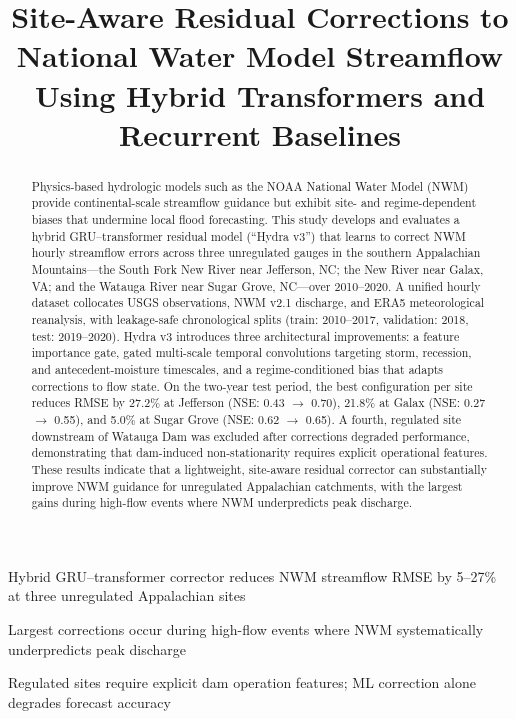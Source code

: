 \documentclass[draft]{agujournal2019}
\begin{document}
\title{Site-Aware Residual Corrections to National Water Model Streamflow Using Hybrid Transformers and Recurrent Baselines}




\begin{keypoints}
\item Hybrid GRU--transformer corrector reduces NWM streamflow RMSE by 5--27\% at three unregulated Appalachian sites
\item Largest corrections occur during high-flow events where NWM systematically underpredicts peak discharge
\item Regulated sites require explicit dam operation features; ML correction alone degrades forecast accuracy
\end{keypoints}

\begin{abstract}
Physics-based hydrologic models such as the NOAA National Water Model (NWM) provide continental-scale streamflow guidance but exhibit site- and regime-dependent biases that undermine local flood forecasting. This study develops and evaluates a hybrid GRU--transformer residual model (``Hydra v3'') that learns to correct NWM hourly streamflow errors across three unregulated gauges in the southern Appalachian Mountains---the South Fork New River near Jefferson, NC; the New River near Galax, VA; and the Watauga River near Sugar Grove, NC---over 2010--2020. A unified hourly dataset collocates USGS observations, NWM v2.1 discharge, and ERA5 meteorological reanalysis, with leakage-safe chronological splits (train: 2010--2017, validation: 2018, test: 2019--2020). Hydra v3 introduces three architectural improvements: a feature importance gate, gated multi-scale temporal convolutions targeting storm, recession, and antecedent-moisture timescales, and a regime-conditioned bias that adapts corrections to flow state. On the two-year test period, the best configuration per site reduces RMSE by 27.2\% at Jefferson (NSE: 0.43 $\to$ 0.70), 21.8\% at Galax (NSE: 0.27 $\to$ 0.55), and 5.0\% at Sugar Grove (NSE: 0.62 $\to$ 0.65). A fourth, regulated site downstream of Watauga Dam was excluded after corrections degraded performance, demonstrating that dam-induced non-stationarity requires explicit operational features. These results indicate that a lightweight, site-aware residual corrector can substantially improve NWM guidance for unregulated Appalachian catchments, with the largest gains during high-flow events where NWM underpredicts peak discharge.
\end{abstract}
\end{document}
